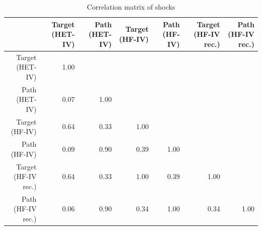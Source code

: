 \begin{table}[ht]
\centering
\begin{tabular}{rrrrrrr}
  \hline
 & Target (HET-IV) & Path (HET-IV) & Target (HF-IV) & Path (HF-IV) & Target (HF-IV rec.) & Path (HF-IV rec.) \\ 
  \hline
Target (HET-IV) & 1.00 &  &  &  &  &  \\ 
  Path (HET-IV) & 0.07 & 1.00 &  &  &  &  \\ 
  Target (HF-IV) & 0.64 & 0.33 & 1.00 &  &  &  \\ 
  Path (HF-IV) & 0.09 & 0.90 & 0.39 & 1.00 &  &  \\ 
  Target (HF-IV rec.) & 0.64 & 0.33 & 1.00 & 0.39 & 1.00 &  \\ 
  Path (HF-IV rec.) & 0.06 & 0.90 & 0.34 & 1.00 & 0.34 & 1.00 \\ 
   \hline
\end{tabular}
\caption{Correlation matrix of shocks} 
\label{tab:correlation_shocks}
\end{table}
